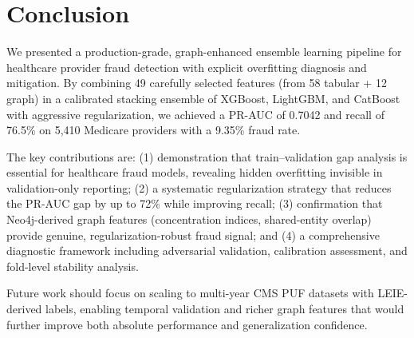 \documentclass[conference]{IEEEtran}
\begin{document}
\section{Conclusion}
\label{sec:conclusion}

We presented a production-grade, graph-enhanced ensemble learning pipeline for healthcare provider fraud detection with explicit overfitting diagnosis and mitigation. By combining 49 carefully selected features (from 58 tabular + 12 graph) in a calibrated stacking ensemble of XGBoost, LightGBM, and CatBoost with aggressive regularization, we achieved a PR-AUC of 0.7042 and recall of 76.5\% on 5,410 Medicare providers with a 9.35\% fraud rate.

The key contributions are: (1) demonstration that train--validation gap analysis is essential for healthcare fraud models, revealing hidden overfitting invisible in validation-only reporting; (2) a systematic regularization strategy that reduces the PR-AUC gap by up to 72\% while improving recall; (3) confirmation that Neo4j-derived graph features (concentration indices, shared-entity overlap) provide genuine, regularization-robust fraud signal; and (4) a comprehensive diagnostic framework including adversarial validation, calibration assessment, and fold-level stability analysis.

Future work should focus on scaling to multi-year CMS PUF datasets with LEIE-derived labels, enabling temporal validation and richer graph features that would further improve both absolute performance and generalization confidence.
\end{document}
